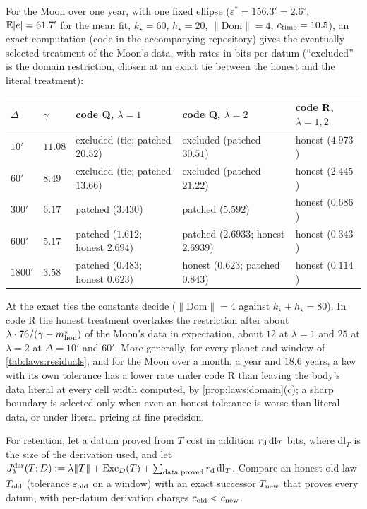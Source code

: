 For the Moon over one year, with one fixed ellipse ($\varepsilon^*=156.3'=2.6^\circ$, $\mathbb{E}\lvert e\rvert=61.7'$ for the mean fit, $k_\star=60$, $h_\star=20$, $\lVert\mathrm{Dom}\rVert=4$, $c_{\rm time}=10.5$), an exact computation (code in the accompanying repository) gives the eventually selected treatment of the Moon's data, with rates in bits per datum (``excluded'' is the domain restriction, chosen at an exact tie between the honest and the literal treatment):
\begin{center}\small
\begin{tabular}{lllll}
\toprule
$\Delta$ & $\gamma$ & code Q, $\lambda=1$ & code Q, $\lambda=2$ & code R, $\lambda=1,2$\\
\midrule
$10'$ & $11.08$ & excluded (tie; patched $20.52$) & excluded (patched $30.51$) & honest ($4.973$)\\
$60'$ & $8.49$ & excluded (tie; patched $13.66$) & excluded (patched $21.22$) & honest ($2.445$)\\
$300'$ & $6.17$ & patched ($3.430$) & patched ($5.592$) & honest ($0.686$)\\
$600'$ & $5.17$ & patched ($1.612$; honest $2.694$) & patched ($2.6933$; honest $2.6939$) & honest ($0.343$)\\
$1800'$ & $3.58$ & patched ($0.483$; honest $0.623$) & honest ($0.623$; patched $0.843$) & honest ($0.114$)\\
\bottomrule
\end{tabular}
\end{center}
At the exact ties the constants decide ($\lVert\mathrm{Dom}\rVert=4$ against $k_\star+h_\star=80$). In code R the honest treatment overtakes the restriction after about $\lambda\cdot76/(\gamma-m^\star_{\rm hon})$ of the Moon's data in expectation, about $12$ at $\lambda=1$ and $25$ at $\lambda=2$ at $\Delta=10'$ and $60'$. More generally, for every planet and window of \cref{tab:laws:residuals}, and for the Moon over a month, a year and $18.6$ years, a law with its own tolerance has a lower rate under code R than leaving the body's data literal at every cell width computed, by \cref{prop:laws:domain}(c); a sharp boundary is selected only when even an honest tolerance is worse than literal data, or under literal pricing at fine precision.

For retention, let a datum proved from $T$ cost in addition $r_{\rm d}\,\mathrm{dl}_T$ bits, where $\mathrm{dl}_T$ is the size of the derivation used, and let $J^{\rm der}_\lambda(T;D):=\lambda\lVert T\rVert+\mathrm{Exc}_D(T)+\sum_{\text{data proved}}r_{\rm d}\,\mathrm{dl}_T$. Compare an honest old law $T_{\rm old}$ (tolerance $\varepsilon_{\rm old}$ on a window) with an exact successor $T_{\rm new}$ that proves every datum, with per-datum derivation charges $c_{\rm old}<c_{\rm new}$.

